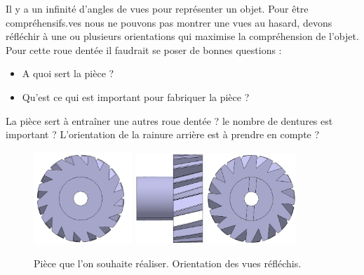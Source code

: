\documentclass[
	11pt, %
	fleqn, %
	a4paper, %
]{LegrandOrangeBook}
\begin{document}
Il y a un infinité d'angles de vues pour représenter un objet. Pour être compréhensifs.ves nous ne pouvons pas montrer une vues au hasard, devons réfléchir à une ou plusieurs orientations qui maximise la compréhension de l'objet. Pour cette roue dentée il faudrait se poser de bonnes questions : 
\begin{itemize}
    \item A quoi sert la pièce ?
    \item Qu'est ce qui est important pour fabriquer la pièce ?
\end{itemize}

La pièce sert à entraîner une autres roue dentée ? le nombre de dentures est important ? L'orientation de la rainure arrière est à prendre en compte ?

\begin{figure}[H] %
	\centering %
	\includegraphics[width=0.33\textwidth]{Images/RF.JPG} %
    \includegraphics[width=0.23\textwidth]{Images/RC.JPG} %
    \includegraphics[width=0.3\textwidth]{Images/RD.JPG} %
	\caption{Pièce que l'on souhaite réaliser. Orientation des vues réfléchis.}
	\label{Roue2} %
\end{figure}
\end{document}
